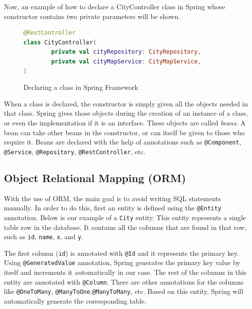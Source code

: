 Now, an example of how to declare a CityController class in Spring whose constructor contains two private parameters will be shown.

\begin{figure}[hbt!]
    \begin{center}
        \begin{lstlisting}[language=Kotlin,label={lst:spring-code-1},belowskip=-1 \baselineskip]
@RestController
class CityController(
        private val cityRepository: CityRepository,
        private val cityMapService: CityMapService,
)
        \end{lstlisting}
    \end{center}
    \caption{Declaring a class in Spring Framework}
    \label{fig:figure4.7}
\end{figure}

When a class is declared, the constructor is simply given all the objects needed in that class. Spring gives those objects during the
creation of an instance of a class, or even the implementation if it is an interface. These objects are called \emph{beans}. A bean can take
other beans in the constructor, or can itself be given to those who require it. Beans are declared with the help of annotations such as
\texttt{@Component}, \texttt{@Service}, \texttt{@Repository}, \texttt{@RestController}, etc.

\subsection{Object Relational Mapping (ORM)}\label{subsec:object-relational-mapping}

With the use of ORM, the main goal is to avoid writing SQL statements manually. In order to do this, first an entity is defined using the
\texttt{@Entity} annotation. Below is our example of a \texttt{City} entity. This entity represents a single table row in the
database. It contains all the columns that are found in that row, such as \texttt{id}, \texttt{name}, \texttt{x}, and \texttt{y}.

The first column (\texttt{id}) is annotated with \texttt{@Id} and it represents the primary key. Using \texttt{@GeneratedValue} annotation, Spring
generates the primary key value by itself and increments it automatically in our case. The rest of the columns in this entity are annotated
with \texttt{@Column}. There are other annotations for the columns like \texttt{@OneToMany}, \texttt{@ManyToOne},\texttt{@ManyToMany}, etc.
Based on this entity, Spring will automatically generate the corresponding table.

